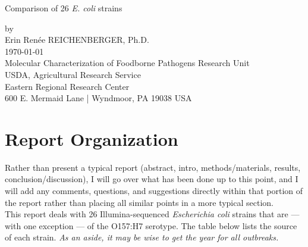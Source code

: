 \documentclass[11pt]{article}
\begin{document}
\begin{center}
\vspace{5.75cm}
\Huge{Comparison of 26 \textit{E. coli} strains}\\
\vspace{6.75cm}

\normalsize{by} \\
\vspace{.75cm}
\normalsize{Erin Ren\'{e}e REICHENBERGER, Ph.D.} \\
\vspace{4.75cm}
\large{\normalsize{\today}} \\

\vspace{2.75cm}
\normalsize{Molecular Characterization of Foodborne Pathogens Research Unit}\\   %
\normalsize{USDA, Agricultural Research Service} \\
\normalsize{Eastern Regional Research Center} \\
\normalsize{600 E. Mermaid Lane | Wyndmoor, PA 19038 USA}
\end{center}
\clearpage

\section*{Report Organization}
Rather than present a typical report (abstract, intro, methods/materials, results, conclusion/discussion), I will go over what has been done up to this point, and I will add any comments, questions, and suggestions directly within that portion of the report rather than placing all similar points in a more typical section.\\

This report deals with 26 Illumina-sequenced \textit{Escherichia coli} strains that are --- with one exception --- of the O157:H7 serotype. The table below lists the source of each strain. \textit{As an aside, it may be wise to get the year for all outbreaks.}\\
\end{document}
